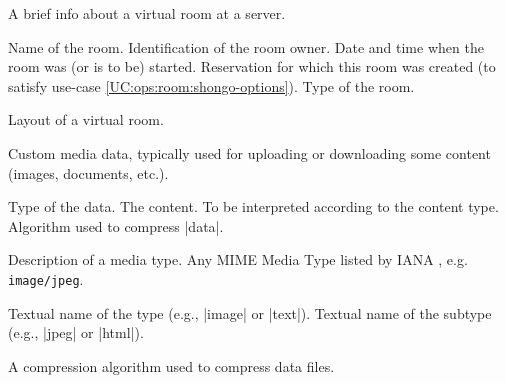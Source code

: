 \begin{Api}
A brief info about a virtual room at a server.
\begin{ApiClassAttributes}
 Name of the room.
 Identification of the room owner.
 Date and time when the room was (or is to be) started.
 Reservation for which this room was created (to satisfy use-case \ref{UC:ops:room:shongo-options}).
 Type of the room.
\end{ApiClassAttributes}

Layout of a virtual room.
\begin{ApiEnumValues}
\end{ApiEnumValues}

Custom media data, typically used for uploading or downloading some content (images, documents, etc.).
\begin{ApiClassAttributes}
 Type of the data.
 The content. To be interpreted according to the content type.
 Algorithm used to compress |data|.
\end{ApiClassAttributes}

Description of a media type. Any MIME Media Type listed by IANA \cite{IANA-MediaTypes}, e.g. \texttt{image/jpeg}.
\begin{ApiClassAttributes}
 Textual name of the type (e.g., |image| or |text|).
 Textual name of the subtype (e.g., |jpeg| or |html|).
\end{ApiClassAttributes}

A compression algorithm used to compress data files.
\begin{ApiEnumValues}
\end{ApiEnumValues}


\end{Api}


